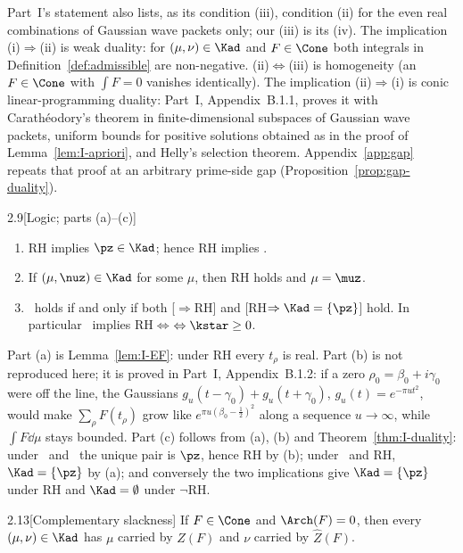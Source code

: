 Part~I's statement also lists, as its condition (iii), condition (ii) for the even real combinations of Gaussian wave packets only; our
(iii) is its (iv). The
implication (i)$\Rightarrow$(ii) is weak duality: for $(\mu,\nu)\in\Kad$ and $F\in\Cone$ both integrals in Definition~\ref{def:admissible}
are non-negative. (ii)$\Leftrightarrow$(iii) is homogeneity (an $F\in\Cone$ with $\int F=0$ vanishes identically). The implication
(ii)$\Rightarrow$(i) is conic linear-programming duality: Part~I, Appendix~B.1.1, proves it with Carath\'eodory's theorem in
finite-dimensional subspaces of Gaussian wave packets, uniform bounds for positive solutions obtained as in the proof of
Lemma~\ref{lem:I-apriori}, and Helly's selection theorem. Appendix~\ref{app:gap} repeats that proof at an arbitrary prime-side gap
(Proposition~\ref{prop:gap-duality}).

\begin{Itheorem}{2.9}[Logic; parts (a)--(c)]\label{thm:I-logic}
\begin{enumerate}[label=\textup{(\alph*)}]
\item RH implies $\pz\in\Kad$; hence RH implies \condE.
\item If $(\mu,\nuz)\in\Kad$ for some $\mu$, then RH holds and $\mu=\muz$.
\item \condU\ holds if and only if both \textup{[}\condE$\Rightarrow$RH\textup{]} and \textup{[}RH$\Rightarrow\Kad=\{\pz\}$\textup{]} hold. In
particular \condU\ implies RH$\Leftrightarrow$\condE$\Leftrightarrow\kstar\ge0$.
\end{enumerate}
\end{Itheorem}

Part (a) is Lemma~\ref{lem:I-EF}: under RH every $t_\rho$ is real. Part (b) is not reproduced here; it is proved in Part~I,
Appendix~B.1.2: if a zero
$\rho_0=\beta_0+i\gamma_0$ were off the line, the Gaussians $g_u(t-\gamma_0)+g_u(t+\gamma_0)$, $g_u(t)=e^{-\pi ut^2}$, would make
$\sum_\rho F(t_\rho)$ grow like $e^{\pi u(\beta_0-\frac12)^2}$ along a sequence $u\to\infty$, while $\int F\dd\mu$ stays bounded. Part (c)
follows from (a), (b) and Theorem~\ref{thm:I-duality}: under \condU\ and \condE\ the unique pair is $\pz$, hence RH by (b); under \condU\ and RH,
$\Kad=\{\pz\}$ by (a); and conversely the two implications give $\Kad=\{\pz\}$ under RH and $\Kad=\emptyset$ under $\neg$RH.

\begin{Ilemma}{2.13}[Complementary slackness]\label{lem:I-compslack}
If $F\in\Cone$ and $\Arch(F)=0$, then every $(\mu,\nu)\in\Kad$ has $\mu$ carried by $Z(F)$ and $\nu$ carried by $\widehat Z(F)$.
\end{Ilemma}

